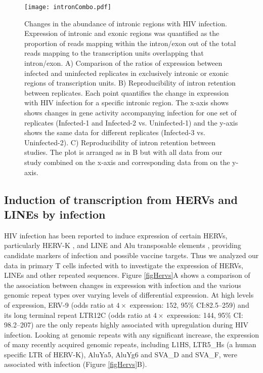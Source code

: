 \documentclass[../sherrill-Mix_thesis.tex]{subfiles}
\begin{document}
		\begin{figure}
			\centering
				\texttt{[image: intronCombo.pdf]}
			\caption[Changes in the abundance of intronic regions with HIV infection]{Changes in the abundance of intronic regions with HIV infection. Expression of intronic and exonic regions was quantified as the proportion of reads mapping within the intron/exon out of the total reads mapping to the transcription units overlapping that intron/exon. A) Comparison of the ratios of expression between infected and uninfected replicates in exclusively intronic or exonic regions of transcription units. B) Reproducibility of intron retention between replicates. Each point quantifies the change in expression with HIV infection for a specific intronic region. The x-axis shows shows changes in gene activity accompanying infection for one set of replicates (Infected-1 and Infected-2 vs. Uninfected-1) and the y-axis shows the same data for different replicates (Infected-3 vs. Uninfected-2). C) Reproducibility of intron retention between studies. The plot is arranged as in B but with all data from our study combined on the x-axis and corresponding data from \citet{Chang2011} on the y-axis.}
			\label{figIntron}
		\end{figure}

	\subsection{Induction of transcription from HERVs and LINEs by \hivEight{} infection}
		HIV infection has been reported to induce expression of certain HERVs, particularly HERV-K \citep{Contreras-Galindo2007,Contreras-Galindo2013,Bhardwaj2014}, and LINE and Alu transposable elements \citep{Jones2013}, providing candidate markers of infection and possible vaccine targets.  Thus we analyzed our data in primary T cells infected with \hivEight{} to investigate the expression of HERVs, LINEs and other repeated sequences.  Figure \ref{figHervs}A shows a comparison of the association between changes in expression with \hivEight{} infection and the various genomic repeat types over varying levels of differential expression. At high levels of expression, ERV-9  (odds ratio at $4\times$ expression: 152, 95\% CI:82.5--259) and its long terminal repeat LTR12C  (odds ratio at $4\times$ expression: 144, 95\% CI: 98.2--207) are the only repeats highly associated with upregulation during HIV infection. Looking at genomic repeats with any significant increase, the expression of many recently acquired genomic repeats, including L1HS, LTR5\_Hs (a human specific LTR of HERV-K), AluYa5, AluYg6 and SVA\_D and SVA\_F, were associated with \hivEight{} infection (Figure \ref{figHervs}B). 
		
\end{document}
